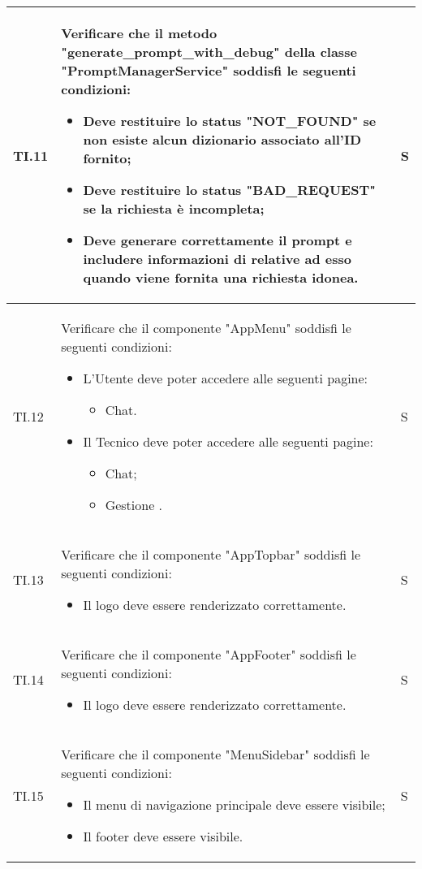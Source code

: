 \begin{adjustwidth}{-0.5cm}{-0.5cm}
\begin{longtable}{|P{1.5cm}|>{\raggedright}P{9.5cm}|>{\arraybackslash}P{1.5cm}|}
		\hline TI.11 & Verificare che il metodo "generate\_prompt\_with\_debug" della classe "PromptManagerService" soddisfi le seguenti condizioni:
		\begin{itemize}
			\item Deve restituire lo status "NOT_FOUND" se non esiste alcun dizionario associato all'ID fornito;
			\item Deve restituire lo status "BAD_REQUEST" se la richiesta è incompleta;
			\item Deve generare correttamente il prompt e includere informazioni di  relative ad esso quando viene fornita una richiesta idonea.
		\end{itemize} & S \\

    \hline TI.12 & Verificare che il componente "AppMenu" soddisfi le seguenti condizioni:
    \begin{itemize}
      \item L'Utente deve poter accedere alle seguenti pagine:
      \begin{itemize}
        \item Chat.
      \end{itemize}
      \item Il Tecnico deve poter accedere alle seguenti pagine:
      \begin{itemize}
        \item Chat;
        \item Gestione .
      \end{itemize}
    \end{itemize} & S \\

    \hline TI.13 & Verificare che il componente "AppTopbar" soddisfi le seguenti condizioni:
    \begin{itemize}
      \item Il logo deve essere renderizzato correttamente.
    \end{itemize} & S \\

    \hline TI.14 & Verificare che il componente "AppFooter" soddisfi le seguenti condizioni:
    \begin{itemize}
      \item Il logo deve essere renderizzato correttamente.
    \end{itemize} & S \\

    \hline TI.15 & Verificare che il componente "MenuSidebar" soddisfi le seguenti condizioni:
    \begin{itemize}
      \item Il menu di navigazione principale deve essere visibile;
      \item Il footer deve essere visibile.
    \end{itemize} & S \\


\end{longtable}
\end{adjustwidth}
